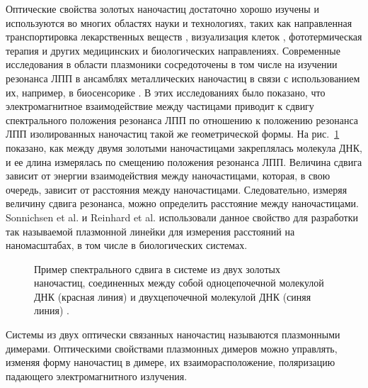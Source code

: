 Оптические свойства золотых наночастиц достаточно хорошо изучены и используются во многих областях науки и технологиях, таких как направленная транспортировка лекарственных веществ \cite{drugDelivery}, визуализация клеток \cite{cellImaging}, фототермическая терапия \cite{photothermalTherapy} и других медицинских и биологических направлениях. Современные исследования в области плазмоники сосредоточены в том числе на изучении резонанса ЛПП в ансамблях металлических наночастиц в связи с использованием их, например, в биосенсорике \cite{biosensing}. В этих исследованиях было показано, что электромагнитное взаимодействие между частицами приводит к сдвигу спектрального положения резонанса ЛПП по отношению к положению резонанса ЛПП изолированных наночастиц такой же геометрической формы. На рис.~\ref{img:bioDNA} показано, как между двумя золотыми наночастицами закреплялась молекула ДНК, и ее длина измерялась по смещению положения резонанса ЛПП. Величина сдвига зависит от энергии взаимодействия между наночастицами, которая, в свою очередь, зависит от расстояния между наночастицами. Следовательно, измеряя величину сдвига резонанса, можно определить расстояние между наночастицами. Sonnichsen et al. \cite{bioplasmonruler} и Reinhard et al. \cite{bioplasmonruler2} использовали данное свойство для разработки так называемой  плазмонной линейки для измерения расстояний на наномасштабах, в том числе в биологических системах.
\begin{figure}
\caption{Пример спектрального сдвига в системе из двух золотых наночастиц, соединенных между собой одноцепочечной молекулой ДНК (красная линия) и двухцепочечной молекулой ДНК (синяя линия) \cite{biosensing}.}
\label{img:bioDNA}
\end{figure}
Системы из двух оптически связанных наночастиц называются плазмонными димерами. Оптическими свойствами плазмонных димеров можно управлять, изменяя форму наночастиц в димере, их взаиморасположение, поляризацию падающего электромагнитного излучения.

